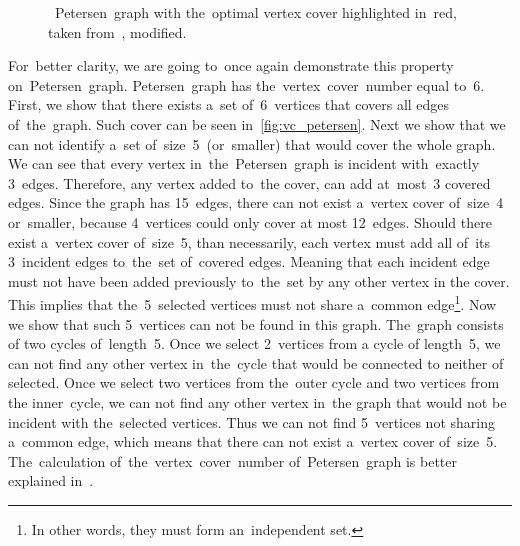 \begin{center}
    \begin{figure}[h!]
        \centering
        \caption[Petersen~graph with the optimal vertex cover]{~Petersen~graph with the~optimal vertex cover highlighted in~red, taken from~\cite{soPetersen}, modified.}
        \label{fig:vc_petersen}
    \end{figure}
\end{center}
For~better clarity, we are going to~once again demonstrate this property on~Petersen~graph.
Petersen~graph has the~vertex~cover~number equal to~6. First, we show that there exists a~set of~6~vertices that covers all edges of~the~graph. Such cover can be seen in~\autoref{fig:vc_petersen}. Next we show that we can not identify a~set of~size~5~(or~smaller) that would cover the whole graph. We can see that every vertex in~the~Petersen~graph is incident with~exactly 3~edges. Therefore, any vertex added to~the cover, can add at~most~3 covered edges. Since the graph has 15~edges, there can not exist a~vertex cover of~size~4 or~smaller, because 4~vertices could only cover at most 12~edges. Should there exist a~vertex cover of~size~5, than necessarily, each vertex must add all of~its 3~incident edges to~the~set of~covered edges. Meaning that each incident edge must not have been added previously to~the~set by any other vertex in the cover. This implies that the~5~selected vertices must not share a~common edge\footnote{In other words, they must form an~independent set.}. Now we show that such 5~vertices can not be found in this graph. The~graph consists of two cycles of~length~5. Once we select 2~vertices from a cycle of length~5, we can not find any other vertex in~the~cycle that would be connected to neither of selected. Once we select two vertices from the~outer cycle and two vertices from the inner~cycle, we can not find any other vertex in~the graph that would not be incident with the~selected vertices. Thus we can not find 5~vertices not sharing a~common edge, which means that there can not exist a~vertex cover of~size~5. The~calculation of~the~vertex~cover~number of~Petersen~graph is better explained in~\cite{Behsaz}.
